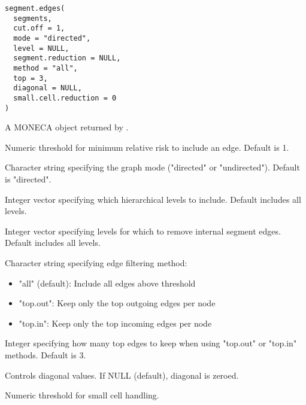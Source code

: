 \documentclass[a4paper]{book}
\begin{document}
%
\begin{Usage}
\begin{verbatim}
segment.edges(
  segments,
  cut.off = 1,
  mode = "directed",
  level = NULL,
  segment.reduction = NULL,
  method = "all",
  top = 3,
  diagonal = NULL,
  small.cell.reduction = 0
)
\end{verbatim}
\end{Usage}
%
\begin{Arguments}
\begin{ldescription}
\item[\code{segments}] A MONECA object returned by .

\item[\code{cut.off}] Numeric threshold for minimum relative risk to include an edge.
Default is 1.

\item[\code{mode}] Character string specifying the graph mode ("directed" or "undirected").
Default is "directed".

\item[\code{level}] Integer vector specifying which hierarchical levels to include.
Default includes all levels.

\item[\code{segment.reduction}] Integer vector specifying levels for which to remove
internal segment edges. Default includes all levels.

\item[\code{method}] Character string specifying edge filtering method:
\begin{itemize}

\item{} "all" (default): Include all edges above threshold
\item{} "top.out": Keep only the top outgoing edges per node
\item{} "top.in": Keep only the top incoming edges per node

\end{itemize}


\item[\code{top}] Integer specifying how many top edges to keep when using 
"top.out" or "top.in" methods. Default is 3.

\item[\code{diagonal}] Controls diagonal values. If NULL (default), diagonal is zeroed.

\item[\code{small.cell.reduction}] Numeric threshold for small cell handling.
\end{ldescription}
\end{Arguments}
\end{document}

